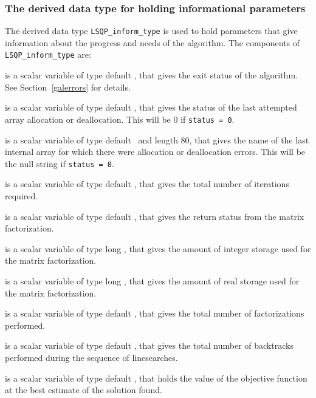 \documentclass{galahad}
\newcommand{\packagename}{LSQP}
\begin{document}

\subsubsection{The derived data type for holding informational
 parameters}\label{typeinform}
The derived data type 
{\tt \packagename\_inform\_type} 
is used to hold parameters that give information about the progress and needs 
of the algorithm. The components of 
{\tt \packagename\_inform\_type} 
are:

\begin{description}

 is a scalar variable of type default \integer, that gives the
exit status of the algorithm. 
See Section~\ref{galerrors}
for details.

 is a scalar variable of type default \integer, that gives
the status of the last attempted array allocation or deallocation.
This will be 0 if {\tt status = 0}.

 is a scalar variable of type default \character\
and length 80, that  gives the name of the last internal array 
for which there were allocation or deallocation errors.
This will be the null string if {\tt status = 0}. 

 is a scalar variable of type default \integer, that gives the
total number of iterations required.

 is a scalar variable of type default \integer, that 
gives the return status from the matrix factorization.

 is a scalar variable of type long
\integer, that gives the amount of integer storage used for the matrix 
factorization.

 is a scalar variable of type long \integer, 
that gives the amount of real storage used for the matrix factorization.

 is a scalar variable of type default \integer, that gives the
total number of factorizations performed.

 is a scalar variable of type default \integer, that gives the
total number of backtracks performed during the sequence of linesearches.

 is a scalar variable of type default \realdp, that holds the
value of the objective function at the best estimate of the solution found.


\end{description}
\end{document}
